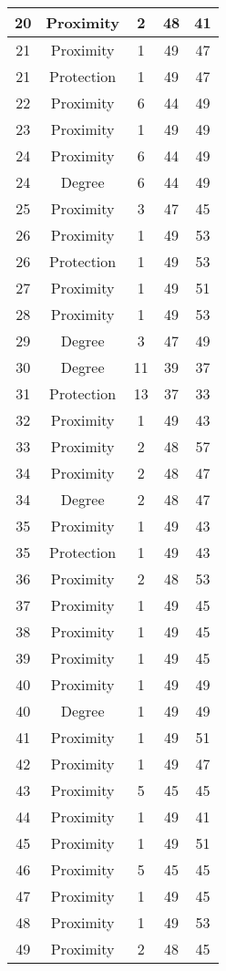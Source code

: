 \documentclass[results.tex]{subfiles}
\begin{document}
\begin{center}
\begin{tabular}{| c || c | c | c | c |}
    \hline
    20 & Proximity & 2 & 48 & 41 \\ 
    \hline
    21 & Proximity & 1 & 49 & 47 \\ 
    \hline
    21 & Protection & 1 & 49 & 47 \\ 
    \hline
    22 & Proximity & 6 & 44 & 49 \\ 
    \hline
    23 & Proximity & 1 & 49 & 49 \\ 
    \hline
    24 & Proximity & 6 & 44 & 49 \\ 
    \hline
    24 & Degree & 6 & 44 & 49 \\ 
    \hline
    25 & Proximity & 3 & 47 & 45 \\ 
    \hline
    26 & Proximity & 1 & 49 & 53 \\ 
    \hline
    26 & Protection & 1 & 49 & 53 \\ 
    \hline
    27 & Proximity & 1 & 49 & 51 \\ 
    \hline
    28 & Proximity & 1 & 49 & 53 \\ 
    \hline
    29 & Degree & 3 & 47 & 49 \\ 
    \hline
    30 & Degree & 11 & 39 & 37 \\ 
    \hline
    31 & Protection & 13 & 37 & 33 \\ 
    \hline
    32 & Proximity & 1 & 49 & 43 \\ 
    \hline
    33 & Proximity & 2 & 48 & 57 \\ 
    \hline
    34 & Proximity & 2 & 48 & 47 \\ 
    \hline
    34 & Degree & 2 & 48 & 47 \\ 
    \hline
    35 & Proximity & 1 & 49 & 43 \\ 
    \hline
    35 & Protection & 1 & 49 & 43 \\ 
    \hline
    36 & Proximity & 2 & 48 & 53 \\ 
    \hline
    37 & Proximity & 1 & 49 & 45 \\ 
    \hline
    38 & Proximity & 1 & 49 & 45 \\ 
    \hline
    39 & Proximity & 1 & 49 & 45 \\ 
    \hline
    40 & Proximity & 1 & 49 & 49 \\ 
    \hline
    40 & Degree & 1 & 49 & 49 \\ 
    \hline
    41 & Proximity & 1 & 49 & 51 \\ 
    \hline
    42 & Proximity & 1 & 49 & 47 \\ 
    \hline
    43 & Proximity & 5 & 45 & 45 \\ 
    \hline
    44 & Proximity & 1 & 49 & 41 \\ 
    \hline
    45 & Proximity & 1 & 49 & 51 \\ 
    \hline
    46 & Proximity & 5 & 45 & 45 \\ 
    \hline
    47 & Proximity & 1 & 49 & 45 \\ 
    \hline
    48 & Proximity & 1 & 49 & 53 \\ 
    \hline
    49 & Proximity & 2 & 48 & 45 \\ 
    \hline   \end{tabular}
\end{center}
\end{document}
